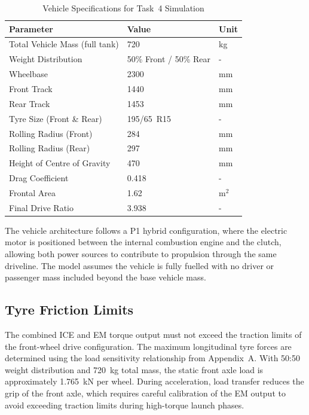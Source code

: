 \begin{table}[H]
\centering
\caption{Vehicle Specifications for Task~4 Simulation}
\label{tab:vehicle_specs}
\small
\begin{tabular}{@{}lll@{}}
\toprule
\textbf{Parameter} & \textbf{Value} & \textbf{Unit} \\
\midrule
Total Vehicle Mass (full tank) & 720 & kg \\
Weight Distribution & 50\% Front / 50\% Rear & - \\
Wheelbase & 2300 & mm \\
Front Track & 1440 & mm \\
Rear Track & 1453 & mm \\
Tyre Size (Front \& Rear) & 195/65~R15 & - \\
Rolling Radius (Front) & 284 & mm \\
Rolling Radius (Rear) & 297 & mm \\
Height of Centre of Gravity & 470 & mm \\
Drag Coefficient & 0.418 & - \\
Frontal Area & 1.62 & m$^2$ \\
Final Drive Ratio & 3.938 & - \\
\bottomrule
\end{tabular}
\end{table}

The vehicle architecture follows a P1 hybrid configuration, where the electric motor is positioned between the internal combustion engine and the clutch, allowing both power sources to contribute to propulsion through the same driveline. The model assumes the vehicle is fully fuelled with no driver or passenger mass included beyond the base vehicle mass.

\subsection{Tyre Friction Limits}

The combined ICE and EM torque output must not exceed the traction limits of the front-wheel drive configuration. The maximum longitudinal tyre forces are determined using the load sensitivity relationship from Appendix~A. With 50:50 weight distribution and 720~kg total mass, the static front axle load is approximately 1.765~kN per wheel. During acceleration, load transfer reduces the grip of the front axle, which requires careful calibration of the EM output to avoid exceeding traction limits during high-torque launch phases.

